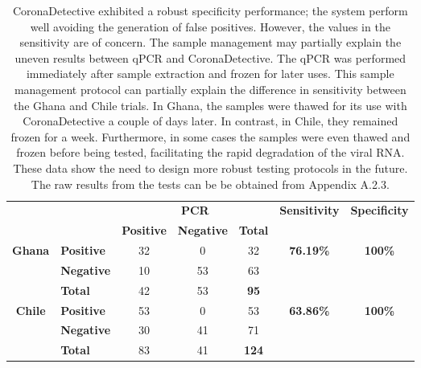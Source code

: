 \begin{table}[]
\begin{center}
\begin{tabular}{clccccc}
\multicolumn{1}{l}{\multirow{2}{*}{}} & \multirow{2}{*}{} & \multicolumn{3}{c}{\textbf{PCR}} & \multirow{2}{*}{\textbf{Sensitivity}} & \multirow{2}{*}{\textbf{Specificity}} \\
\multicolumn{1}{l}{} &  & \textbf{Positive} & \textbf{Negative} & \textbf{Total} &  &  \\
\hline
\multirow{3}{*}{\textbf{Ghana}} & \textbf{Positive} & 32 & 0 & 32 & \multirow{3}{*}{\textbf{76.19\%}} & \multirow{3}{*}{\textbf{100\%}} \\
 & \textbf{Negative} & 10 & 53 & 63 &  &  \\
 & \textbf{Total} & 42 & 53 & \textbf{95} &  &  \\
 \hline
\multirow{3}{*}{\textbf{Chile}} & \textbf{Positive} & 53 & 0 & 53 & \multirow{3}{*}{\textbf{63.86\%}} & \multirow{3}{*}{\textbf{100\%}} \\
 & \textbf{Negative} & 30 & 41 & 71 &  &  \\
 & \textbf{Total} & 83 & 41 & \textbf{124} &  & 
\end{tabular}
\end{center}
\vspace{10pt}
\caption[CoronaDetective field testing results.]{CoronaDetective exhibited a robust specificity performance; the system perform well avoiding the generation of false positives. However, the values in the sensitivity are of concern. The sample management may partially explain the uneven results between qPCR and CoronaDetective. The qPCR was performed immediately after sample extraction and frozen for later uses. This sample management protocol can partially explain the difference in sensitivity between the Ghana and Chile trials. In Ghana, the samples were thawed for its use with CoronaDetective a couple of days later. In contrast, in Chile, they remained frozen for a week. Furthermore, in some cases the samples were even thawed and frozen before being tested, facilitating the rapid degradation of the viral RNA. These data show the need to design more robust testing protocols in the future. The raw results from the tests can be be obtained from Appendix A.2.3.}
\end{table}

